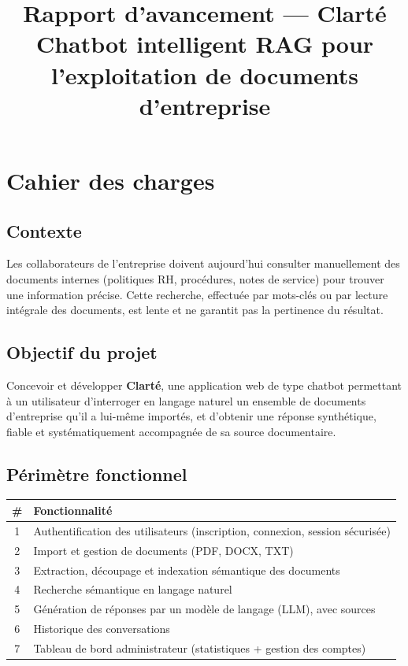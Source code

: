 \documentclass[12pt,a4paper]{article}
\title{\textbf{Rapport d'avancement — Clarté}\\[0.3cm]
\Large Chatbot intelligent RAG pour l'exploitation de documents d'entreprise}
\author{\note {HASSANI Safaa}   }
\date{\note{ 17.08.2026}}
\begin{document}
\maketitle
\thispagestyle{fancy}

\tableofcontents
\vspace{1cm}

\section{Cahier des charges}

\subsection{Contexte}
Les collaborateurs de l'entreprise doivent aujourd'hui consulter manuellement des documents internes (politiques RH, procédures, notes de service) pour trouver une information précise. Cette recherche, effectuée par mots-clés ou par lecture intégrale des documents, est lente et ne garantit pas la pertinence du résultat.

\subsection{Objectif du projet}
Concevoir et développer \textbf{Clarté}, une application web de type chatbot permettant à un utilisateur d'interroger en langage naturel un ensemble de documents d'entreprise qu'il a lui-même importés, et d'obtenir une réponse synthétique, fiable et systématiquement accompagnée de sa source documentaire.

\subsection{Périmètre fonctionnel}

\begin{table}[h]
\centering
\begin{tabular}{|c|l|}
\hline
\textbf{\#} & \textbf{Fonctionnalité} \\
\hline
1 & Authentification des utilisateurs (inscription, connexion, session sécurisée) \\
2 & Import et gestion de documents (PDF, DOCX, TXT) \\
3 & Extraction, découpage et indexation sémantique des documents \\
4 & Recherche sémantique en langage naturel \\
5 & Génération de réponses par un modèle de langage (LLM), avec sources \\
6 & Historique des conversations \\
7 & Tableau de bord administrateur (statistiques + gestion des comptes) \\
\hline
\end{tabular}
\end{table}
\end{document}
